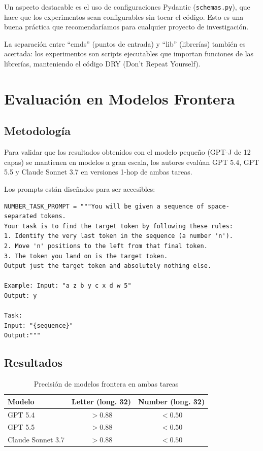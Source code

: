 \documentclass[12pt,a4paper,oneside]{report}
\begin{document}
Un aspecto destacable es el uso de configuraciones Pydantic (\texttt{schemas.py}), que hace que los experimentos sean configurables sin tocar el código. Esto es una buena práctica que recomendaríamos para cualquier proyecto de investigación.

La separación entre ``cmds'' (puntos de entrada) y ``lib'' (librerías) también es acertada: los experimentos son scripts ejecutables que importan funciones de las librerías, manteniendo el código DRY (Don't Repeat Yourself).

\chapter{Evaluación en Modelos Frontera}

\section{Metodología}

Para validar que los resultados obtenidos con el modelo pequeño (GPT-J de 12 capas) se mantienen en modelos a gran escala, los autores evalúan GPT 5.4, GPT 5.5 y Claude Sonnet 3.7 en versiones 1-hop de ambas tareas.

Los prompts están diseñados para ser accesibles:

\begin{lstlisting}
NUMBER_TASK_PROMPT = """You will be given a sequence of space-separated tokens.
Your task is to find the target token by following these rules:
1. Identify the very last token in the sequence (a number 'n').
2. Move 'n' positions to the left from that final token.
3. The token you land on is the target token.
Output just the target token and absolutely nothing else.

Example: Input: "a z b y c x d w 5"
Output: y

Task:
Input: "{sequence}"
Output:"""
\end{lstlisting}

\section{Resultados}

\begin{table}[h]
\centering
\caption{Precisión de modelos frontera en ambas tareas}
\begin{tabular}{lcc}
\toprule
\textbf{Modelo} & \textbf{Letter (long. 32)} & \textbf{Number (long. 32)} \\
\midrule
GPT 5.4     & $>0.88$ & $<0.50$ \\
GPT 5.5     & $>0.88$ & $<0.50$ \\
Claude Sonnet 3.7 & $>0.88$ & $<0.50$ \\
\bottomrule
\end{tabular}
\end{table}
\end{document}
